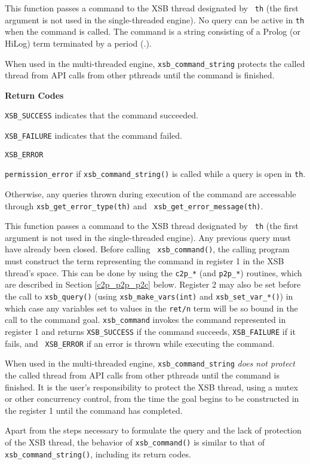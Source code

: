 \begin{description}
%
This function passes a command to the XSB thread designated by {\tt
  th} (the first argument is not used in the single-threaded engine).
No query can be active in {\tt th} when the command is called.  The
command is a string consisting of a Prolog (or HiLog) term terminated
by a period (.).

When used in the multi-threaded engine, {\tt xsb\_command\_string}
protects the called thread from API calls from other pthreads until
the command is finished.

{\bf Return Codes}  
\bi
\item {\tt XSB\_SUCCESS} indicates that the command succeeded.
%
\item {\tt XSB\_FAILURE} indicates that the command failed.
%
\item {\tt XSB\_ERROR} 
\bi
\item {\tt permission\_error} if {\tt xsb\_command\_string()} is
  called while a query is open in {\tt th}.
%
\item Otherwise, any queries thrown during execution of the command
  are accessable through {\tt xsb\_get\_error\_type(th)} and {\tt
    xsb\_get\_error\_message(th)}.
\ei
%
\ei

%
This function passes a command to the XSB thread designated by {\tt
  th} (the first argument is not used in the single-threaded engine).
Any previous query must have already been closed.  Before calling {\tt
  xsb\_command()}, the calling program must construct the term
representing the command in register 1 in the XSB thread's space.
This can be done by using the {\tt c2p\_*} (and {\tt p2p\_*})
routines, which are described in Section \ref{c2p_p2p_p2c} below.
Register 2 may also be set before the call to {\tt xsb\_query()}
(using {\tt xsb\_make\_vars(int)} and {\tt xsb\_set\_var\_*()}) in
which case any variables set to values in the {\tt ret/n} term will be
so bound in the call to the command goal.  {\tt xsb\_command} invokes
the command represented in register 1 and returns {\tt XSB\_SUCCESS}
if the command succeeds, {\tt XSB\_FAILURE} if it fails, and {\tt
  XSB\_ERROR} if an error is thrown while executing the command.

When used in the multi-threaded engine, {\tt xsb\_command\_string}
{\em does not protect} the called thread from API calls from other
pthreads until the command is finished.  It is the user's
responsibility to protect the XSB thread, using a mutex or other
concurrency control, from the time the goal begins to be constructed
in the register 1 until the command has completed.

Apart from the steps necessary to formulate the query and the lack of
protection of the XSB thread, the behavior of {\tt xsb\_command()} is
similar to that of {\tt xsb\_command\_string()}, including its return
codes.
\end{description}

